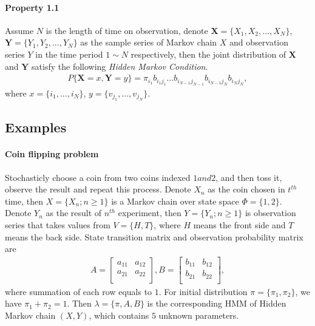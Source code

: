 \documentclass[runningheads]{llncs}
\begin{document}
\paragraph{Property 1.1}
Assume $N$ is the length of time on observation,
denote $\mathbf{X}= \{ X_1, X_2,..., X_N \} $, $\mathbf{Y} = \{ Y_1, Y_2,..., Y_N \} $
as the sample series of Markov chain $X$ and observation series $Y$ in the time period $1\sim N$
respectively, then the joint distribution of $\mathbf{X}$ and $\mathbf{Y}$ satisfy
the following \emph{Hidden Markov Condition}.
\begin{align}
    P\{ \mathbf{X} = x, \mathbf{Y} = y \} = \pi_{i_1} b_{i_1 j_1}... b_{i_{N-1} j_{N-1}} b_{i_{N-1} j_{N}} b_{i_{N} j_{N}},
\end{align}
where $x = \{ i_1, ..., i_N \} $, $y = \{ v_{j_1}, ..., v_{j_N} \} $.

\subsection{Examples}
\paragraph{Coin flipping problem}
Stochasticly choose a coin from two coins indexed $1 and 2$, and then toss it,
observe the result and repeat this process.
Denote $X_n$ as the coin chosen in $t^{th}$ time,
then $X = \{ X_n; n \geq 1 \} $ is a Markov chain over state space
$\Phi = \{ 1, 2 \} $.
Denote $Y_n$ as the result of $n^{th}$ experiment,
then $Y = \{ Y_n; n \geq 1\} $ is observation series
that takes values from $V =  \{ H, T \} $, where $H$ means the front side and $T$
means the back side.
State transition matrix and observation probability matrix are
\begin{align}
    A =
    \begin{bmatrix}
        a_{11} &a_{12} \\
        a_{21} &a_{22} \\
    \end{bmatrix},
    B =
    \begin{bmatrix}
        b_{11} &b_{12} \\
        b_{21} &b_{22} \\
    \end{bmatrix},
\end{align}
where summation of each row equals to $1$.
For initial distribution $\pi = \{ \pi_1, \pi_2 \} $,
we have $\pi_1 + \pi_2 = 1$.
Then $\lambda  =\{ \pi, A, B \} $ is the corresponding HMM of Hidden Markov chain $(X, Y)$,
which contains $5$ unknown parameters.
\end{document}
